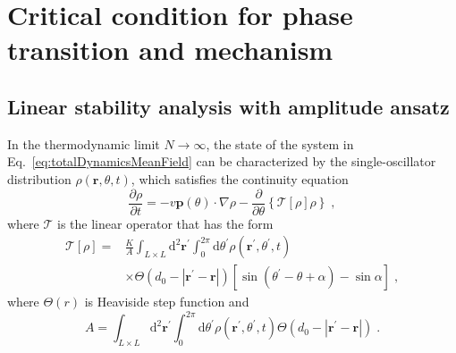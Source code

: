 \documentclass{article}
\begin{document}
\newpage
\section{Critical condition for phase transition and mechanism}

\subsection{Linear stability analysis with amplitude ansatz}

In the thermodynamic limit $N\to \infty$, the state of the system in Eq.~\eqref{eq:totalDynamicsMeanField} can be characterized by the single-oscillator distribution $\rho \left( \mathbf{r},\theta ,t \right) $, which satisfies the continuity equation
\begin{equation}
    \frac{\partial \rho}{\partial t}=-v\mathbf{p}\left( \theta \right) \cdot \nabla \rho -\frac{\partial}{\partial \theta}\left\{ \mathcal{T} \left[ \rho \right] \rho \right\} \;,
    \label{eq:globalContinuityEquation}
\end{equation}
where $\mathcal{T}$ is the linear operator that has the form
\begin{equation}
    \begin{aligned}
        \mathcal{T} \left[ \rho \right] =&\frac{K}{A}\int_{L\times L}{\mathrm{d}^2\mathbf{r}^{\prime}\int_0^{2\pi}{\mathrm{d}\theta ^{\prime}\rho \left( \mathbf{r}^{\prime},\theta ^{\prime},t \right)}}\\
        &\times \Theta \left( d_0 - \left| \mathbf{r}^{\prime}-\mathbf{r} \right| \right) \left[ \sin \left( \theta ^{\prime}-\theta +\alpha \right) -\sin \alpha \right]\;,
    \end{aligned}
\end{equation}
where $\Theta(r) $ is Heaviside step function and  
\begin{equation}
    A=\int_{L\times L}{\mathrm{d}^2\mathbf{r}^{\prime}\int_0^{2\pi}{\mathrm{d}\theta ^{\prime}\rho \left( \mathbf{r}^{\prime},\theta ^{\prime},t \right) \Theta \left( d_0 - \left| \mathbf{r}^{\prime}-\mathbf{r} \right|\right)}}\;.
\end{equation}
\end{document}
